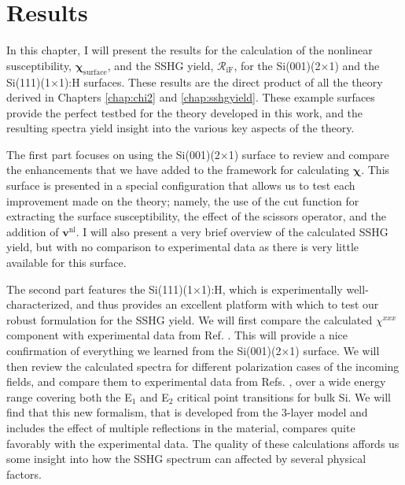 \chapter{Results}\label{chap:results}
\partialtoc

In this chapter, I will present the results for the calculation of the nonlinear
susceptibility, $\boldsymbol{\chi}_{\mathrm{surface}}$, and the SSHG yield,
$\mathcal{R}_{\mathrm{iF}}$, for the Si(001)(2$\times$1) and the
Si(111)(1$\times$1):H surfaces. These results are the direct product of all the
theory derived in Chapters \ref{chap:chi2} and \ref{chap:sshgyield}. These
example surfaces provide the perfect testbed for the theory developed in this
work, and the resulting spectra yield insight into the various key aspects of
the theory.

The first part focuses on using the Si(001)(2$\times$1) surface to review and
compare the enhancements that we have added to the framework for calculating
$\boldsymbol{\chi}$. This surface is presented in a special configuration that
allows us to test each improvement made on the theory; namely, the use of the
cut function for extracting the surface susceptibility, the effect of the
scissors operator, and the addition of $\mathbf{v}^{\mathrm{nl}}$. I will also
present a very brief overview of the calculated SSHG yield, but with no
comparison to experimental data as there is very little available for this
surface.

The second part features the Si(111)(1$\times$1):H, which is experimentally
well-characterized, and thus provides an excellent platform with which to test
our robust formulation for the SSHG yield. We will first compare the calculated
$\chi^{xxx}$ component with experimental data from Ref. \cite{hoferAPA96}. This
will provide a nice confirmation of everything we learned from the
Si(001)(2$\times$1) surface. We will then review the calculated spectra for
different polarization cases of the incoming fields, and compare them to
experimental data from Refs. \cite{bergfeldPRL04, mejiaPRB02, mitchellSS01},
over a wide energy range covering both the E$_{1}$ and E$_{2}$ critical point
transitions for bulk Si. We will find that this new formalism, that is developed
from the 3-layer model and includes the effect of multiple reflections in the
material, compares quite favorably with the experimental data. The quality of
these calculations affords us some insight into how the SSHG spectrum can
affected by several physical factors.


